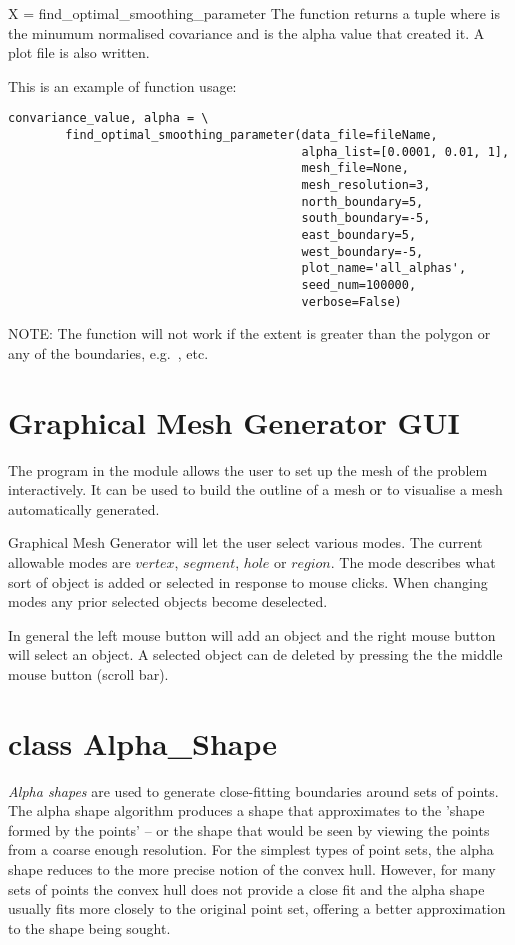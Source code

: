 \documentclass{manual}
\begin{document}
\begin{methoddesc}{X = find_optimal_smoothing_parameter}
The function returns a tuple  where  is
the minumum normalised covariance and  is the alpha value that
created it.  A plot file is also written.

This is an example of function usage: \nopagebreak

\begin{verbatim}
convariance_value, alpha = \
        find_optimal_smoothing_parameter(data_file=fileName,
                                         alpha_list=[0.0001, 0.01, 1],
                                         mesh_file=None,
                                         mesh_resolution=3,
                                         north_boundary=5,
                                         south_boundary=-5,
                                         east_boundary=5,
                                         west_boundary=-5,
                                         plot_name='all_alphas',
                                         seed_num=100000,
                                         verbose=False)
\end{verbatim}

NOTE: The function will not work if the  extent is greater than the
\code{boundary_poly} polygon or any of the boundaries, e.g.\ \code{north_boundary}, etc.
\end{methoddesc}


\pagebreak
\section{Graphical Mesh Generator GUI}
The program  in the  module
allows the user to set up the mesh of the problem interactively.
It can be used to build the outline of a mesh or to visualise a mesh
automatically generated.

Graphical Mesh Generator will let the user select various modes. The
current allowable modes are $vertex$, $segment$, $hole$ or $region$.  The mode
describes what sort of object is added or selected in response to
mouse clicks.  When changing modes any prior selected objects become
deselected.

In general the left mouse button will add an object and the right
mouse button will select an object.  A selected object can de deleted
by pressing the the middle mouse button (scroll bar).


\pagebreak
\section{class Alpha_Shape}
\emph{Alpha shapes} are used to generate close-fitting boundaries
around sets of points. The alpha shape algorithm produces a shape
that approximates to the 'shape formed by the points' -- or the shape
that would be seen by viewing the points from a coarse enough
resolution. For the simplest types of point sets, the alpha shape
reduces to the more precise notion of the convex hull. However, for
many sets of points the convex hull does not provide a close fit and
the alpha shape usually fits more closely to the original point set,
offering a better approximation to the shape being sought.
\end{document}
